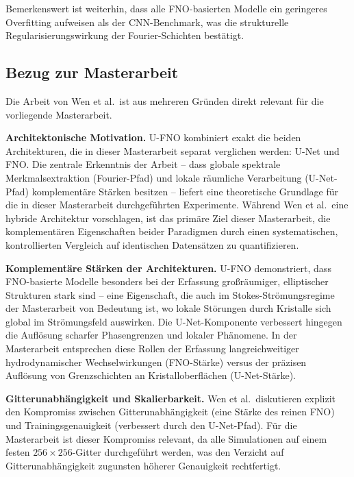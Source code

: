 \documentclass[a4paper,12pt]{article}
\begin{document}
Bemerkenswert ist weiterhin, dass alle FNO-basierten Modelle ein geringeres
Overfitting aufweisen als der CNN-Benchmark, was die strukturelle
Regularisierungswirkung der Fourier-Schichten bestätigt.

\subsection*{Bezug zur Masterarbeit}

Die Arbeit von Wen et al.\ ist aus mehreren Gründen direkt relevant für die
vorliegende Masterarbeit.

\textbf{Architektonische Motivation.}
U-FNO kombiniert exakt die beiden Architekturen, die in dieser Masterarbeit
separat verglichen werden: U-Net und FNO. Die zentrale Erkenntnis der
Arbeit -- dass globale spektrale Merkmalsextraktion (Fourier-Pfad) und lokale
räumliche Verarbeitung (U-Net-Pfad) komplementäre Stärken besitzen -- liefert
eine theoretische Grundlage für die in dieser Masterarbeit durchgeführten
Experimente. Während Wen et al.\ eine hybride Architektur vorschlagen, ist
das primäre Ziel dieser Masterarbeit, die komplementären Eigenschaften beider
Paradigmen durch einen systematischen, kontrollierten Vergleich auf identischen
Datensätzen zu quantifizieren.

\textbf{Komplementäre Stärken der Architekturen.}
U-FNO demonstriert, dass FNO-basierte Modelle besonders bei der Erfassung
großräumiger, elliptischer Strukturen stark sind -- eine Eigenschaft, die
auch im Stokes-Strömungsregime der Masterarbeit von Bedeutung ist, wo lokale
Störungen durch Kristalle sich global im Strömungsfeld auswirken. Die
U-Net-Komponente verbessert hingegen die Auflösung scharfer Phasengrenzen
und lokaler Phänomene. In der Masterarbeit entsprechen diese Rollen der
Erfassung langreichweitiger hydrodynamischer Wechselwirkungen (FNO-Stärke)
versus der präzisen Auflösung von Grenzschichten an Kristalloberflächen
(U-Net-Stärke).

\textbf{Gitterunabhängigkeit und Skalierbarkeit.}
Wen et al.\ diskutieren explizit den Kompromiss zwischen Gitterunabhängigkeit
(eine Stärke des reinen FNO) und Trainingsgenauigkeit (verbessert durch den
U-Net-Pfad). Für die Masterarbeit ist dieser Kompromiss relevant, da alle
Simulationen auf einem festen $256 \times 256$-Gitter durchgeführt werden,
was den Verzicht auf Gitterunabhängigkeit zugunsten höherer Genauigkeit
rechtfertigt.
\end{document}
